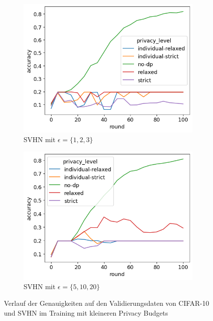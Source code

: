 \begin{figure}[t!]
\begin{subfigure}{0.45\textwidth}
		\includegraphics[width=\linewidth]{Bilder/svhn-accuracy-eps-1-2-3.png}
		\caption{SVHN mit $\epsilon = \{1,2,3\}$}
	\end{subfigure}
	\begin{subfigure}{0.45\textwidth}
		\centering
		\includegraphics[width=\linewidth]{Bilder/svhn-accuracy-eps-5-10-20.png}
		\caption{SVHN mit $\epsilon = \{5,10,20\}$}
	\end{subfigure}
	\caption{Verlauf der Genauigkeiten auf den Validierungsdaten von CIFAR-10 und SVHN im Training mit kleineren Privacy Budgets}
	\vspace{4in}
	\label{fig:cifar-svhn-small-budgets}
\end{figure}
